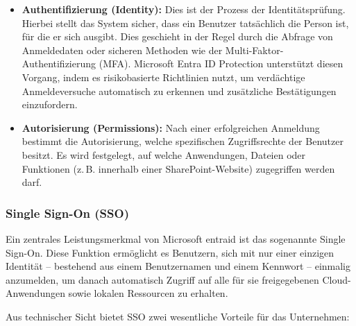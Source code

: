 \begin{itemize}

    \item \textbf{Authentifizierung (Identity):}
          Dies ist der Prozess der Identitätsprüfung. Hierbei stellt das System
          sicher, dass ein Benutzer tatsächlich die Person ist, für die er sich
          ausgibt. Dies geschieht in der Regel durch die Abfrage von Anmeldedaten
          oder sicheren Methoden wie der Multi-Faktor-Authentifizierung (MFA).
          Microsoft Entra ID Protection unterstützt diesen Vorgang, indem es
          risikobasierte Richtlinien nutzt, um verdächtige Anmeldeversuche
          automatisch zu erkennen und zusätzliche Bestätigungen einzufordern.
          \cite{msentra2025,grassi2017nist80063}

    \item \textbf{Autorisierung (Permissions):}
          Nach einer erfolgreichen Anmeldung bestimmt die Autorisierung, welche
          spezifischen Zugriffsrechte der Benutzer besitzt. Es wird festgelegt,
          auf welche Anwendungen, Dateien oder Funktionen (z.\,B. innerhalb einer
          SharePoint-Website) zugegriffen werden darf. \cite{msentra2025}

\end{itemize}

\subsubsection{Single Sign-On (SSO)}

Ein zentrales Leistungsmerkmal von Microsoft \gls{entraid} ist das sogenannte Single
Sign-On. Diese Funktion ermöglicht es Benutzern, sich mit nur einer einzigen
Identität – bestehend aus einem Benutzernamen und einem Kennwort – einmalig
anzumelden, um danach automatisch Zugriff auf alle für sie freigegebenen
Cloud-Anwendungen sowie lokalen Ressourcen zu erhalten.
\cite{msentra2025,grassi2017nist80063}

Aus technischer Sicht bietet SSO zwei wesentliche Vorteile für das Unternehmen:

